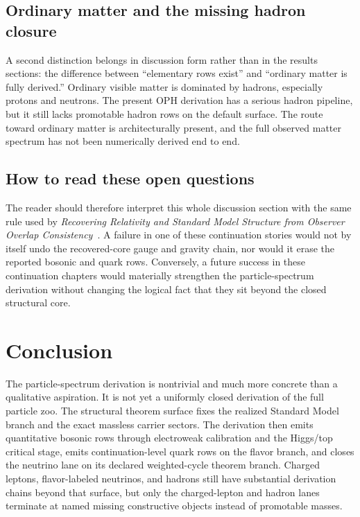 \documentclass[11pt]{article}
\begin{document}
\subsection{Ordinary matter and the missing hadron closure}

A second distinction belongs in discussion form rather than in the results sections: the
difference between ``elementary rows exist'' and ``ordinary matter is fully derived.'' Ordinary
visible matter is dominated by hadrons, especially protons and neutrons. The present OPH
derivation has a serious hadron pipeline, but it still lacks promotable hadron rows on the
default surface. The route toward ordinary matter is architecturally present, and the full
observed matter spectrum has not been numerically derived end to end.

\subsection{How to read these open questions}

The reader should therefore interpret this whole discussion section with the same rule used by
\emph{Recovering Relativity and Standard Model Structure from Observer Overlap Consistency}~\cite{ophcompact}. A failure in one of these continuation stories would not by itself undo the
recovered-core gauge and gravity chain, nor would it erase the reported bosonic and quark
rows. Conversely, a future success in these continuation chapters would materially strengthen the
particle-spectrum derivation without changing the logical fact that they sit beyond the closed
structural core.

\section{Conclusion}

The particle-spectrum derivation is nontrivial and much more concrete than a qualitative aspiration. It is
not yet a uniformly closed derivation of the full particle zoo. The structural theorem surface fixes
the realized Standard Model branch and the exact massless carrier sectors. The derivation
then emits quantitative bosonic rows through electroweak calibration and the Higgs/top critical
stage, emits continuation-level quark rows on the flavor branch, and closes the neutrino lane on
its declared weighted-cycle theorem branch. Charged leptons, flavor-labeled neutrinos, and hadrons
still have substantial derivation chains beyond that surface, but only the charged-lepton and
hadron lanes terminate at named missing constructive objects instead of promotable masses.
\end{document}
